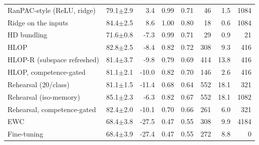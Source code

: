 \begin{tabular}{lrrrrrrr}
RanPAC-style (ReLU, ridge) & 79.1{\tiny$\pm$2.9} & 3.4 & 0.99 & 0.71 & 46 & 1.5 & 1084 \\
Ridge on the inputs & 84.4{\tiny$\pm$2.5} & 8.6 & 1.00 & 0.80 & 18 & 0.6 & 1084 \\
HD bundling & 71.6{\tiny$\pm$0.8} & -7.3 & 0.99 & 0.71 & 29 & 0.9 & 21 \\
HLOP & 82.8{\tiny$\pm$2.5} & -8.4 & 0.82 & 0.72 & 308 & 9.3 & 416 \\
HLOP-R (subspace refreshed) & 81.4{\tiny$\pm$3.7} & -9.8 & 0.79 & 0.69 & 414 & 13.8 & 416 \\
HLOP, competence-gated & 81.1{\tiny$\pm$2.1} & -10.0 & 0.82 & 0.70 & 146 & 2.6 & 416 \\
Rehearsal (20/class) & 81.1{\tiny$\pm$1.5} & -11.4 & 0.68 & 0.64 & 552 & 18.1 & 321 \\
Rehearsal (iso-memory) & 85.1{\tiny$\pm$2.3} & -6.3 & 0.82 & 0.67 & 552 & 18.1 & 1082 \\
Rehearsal, competence-gated & 82.4{\tiny$\pm$2.0} & -10.1 & 0.70 & 0.66 & 261 & 6.0 & 321 \\
EWC & 68.4{\tiny$\pm$3.8} & -27.5 & 0.47 & 0.55 & 308 & 9.9 & 4184 \\
Fine-tuning & 68.4{\tiny$\pm$3.9} & -27.4 & 0.47 & 0.55 & 272 & 8.8 & 0 \\
\bottomrule
\end{tabular}
